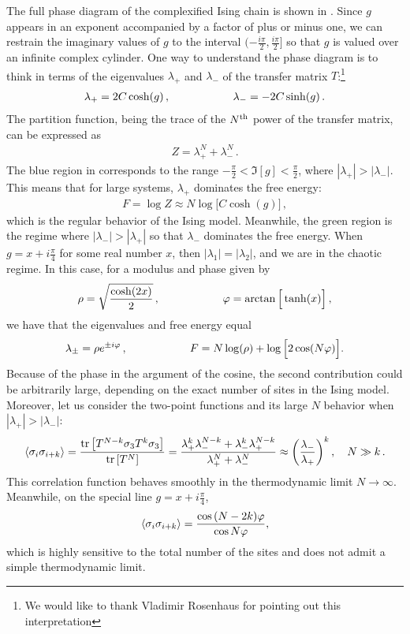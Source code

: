 The full phase diagram of the complexified Ising chain is shown in . Since $g$ appears in an exponent accompanied by a factor of plus or minus one, we can restrain the imaginary values of $g$ to the interval $(-\frac{i\pi}{2},\frac{i\pi}{2}]$ so that $g$ is valued over an infinite complex cylinder. One way to understand the phase diagram is to think in terms of the eigenvalues $\lambda_+$ and $\lambda_-$ of the transfer matrix $T$:\footnote{We would like to thank Vladimir Rosenhaus for pointing out this interpretation}
\begin{align}
\lambda_+ = 2C \cosh(g)\,,
\hspace{20mm}
\lambda_- = -2C \sinh(g)\,.
\end{align}
The partition function, being the trace of the $N^{\rm th}$ power of the transfer matrix, can be expressed as
\begin{align}
Z=\lambda_+^N+\lambda_-^N\,.
\end{align}
The blue region in  corresponds to the range $-\frac{\pi}{2}< \Im[g] <\frac{\pi}{2}$, where $|\lambda_+|>|\lambda_-|$. This means that for large systems, $\lambda_+$ dominates the free energy: 
\begin{align}
F=\log Z \approx N \log \big[C\cosh (g)\big]\,,
\end{align} 
which is the regular behavior of the Ising model. Meanwhile, the green region is the regime where $|\lambda_-|>|\lambda_+|$ so that $\lambda_-$ dominates the free energy. When $g=x+i\frac{\pi}{4}$ for some real number $x$, then $|\lambda_1|=|\lambda_2|$, and we are in the chaotic regime. In this case, for a modulus and phase given by
\begin{align}
\rho = \sqrt{\frac{\cosh(2x)}{2}}\,,\hspace{20mm} \phi = \arctan\Big[\tanh(x)\Big]\,,
\end{align}
we have that the eigenvalues and free energy equal
\begin{align}
\lambda_{\pm}=\rho e^{\pm i\phi}\,, \hspace{20mm} F = N\log(\rho)+\log\Big[2\cos(N\phi)\Big].
\end{align}
Because of the phase in the argument of the cosine, the second contribution could be arbitrarily large, depending on the exact number of sites in the Ising model. Moreover, let us consider the two-point functions and its large $N$ behavior when $\left|\lambda_+\right| > \left|\lambda_-\right|$:
\begin{gather}
\braket{\sigma_i \sigma_{i+k}} = \frac{\operatorname{tr}\left[T^{N-k}\sigma_3 T^k \sigma_3 \right]}{\operatorname{tr}\left[T^N \right]} = \frac{\lambda_+^k \lambda_-^{N-k}+\lambda_-^k \lambda_+^{N-k}}{\lambda_+^N+\lambda_-^N}  \approx \left(\frac{\lambda_{-}}{\lambda_{+}}\right)^k, \quad N\gg k\,.
\end{gather}
This correlation function behaves smoothly in the thermodynamic limit $N\to \infty$.  Meanwhile, on the special line $g= x + i \frac{\pi}{4}$,
\begin{gather}
\braket{\sigma_i \sigma_{i+k}} = \frac{\cos\, (N-2 k ) \varphi}{\cos N \varphi},
\end{gather}
which is highly sensitive to the total number of the sites and does not admit a simple thermodynamic limit. 

